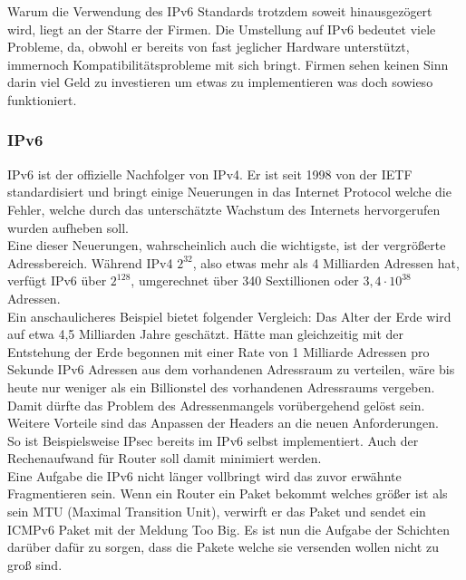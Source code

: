\documentclass[11pt,a4paper]{report}
\begin{document}
Warum die Verwendung des IPv6 Standards trotzdem soweit hinausgezögert wird, liegt an der Starre der Firmen. Die Umstellung auf IPv6 bedeutet viele Probleme, da, obwohl er bereits von fast jeglicher Hardware unterstützt, immernoch Kompatibilitätsprobleme mit sich bringt. Firmen sehen keinen Sinn darin viel Geld zu investieren um etwas zu implementieren was doch sowieso funktioniert.\\
\subsubsection{IPv6}
IPv6 ist der offizielle Nachfolger von IPv4. Er ist seit 1998 von der IETF standardisiert und bringt einige Neuerungen in das Internet Protocol welche die Fehler, welche durch das unterschätzte Wachstum des Internets hervorgerufen wurden aufheben soll.\\

Eine dieser Neuerungen, wahrscheinlich auch die wichtigste, ist der vergrößerte Adressbereich. Während IPv4 $2^{32}$, also etwas mehr als 4 Milliarden Adressen hat, verfügt IPv6 über $2^{128}$, umgerechnet über 340 Sextillionen oder $3,4 \cdot 10^{38}$ Adressen.\\
Ein anschaulicheres Beispiel bietet folgender Vergleich: Das Alter der Erde wird auf etwa 4,5 Milliarden Jahre geschätzt. Hätte man gleichzeitig mit der Entstehung der Erde begonnen mit einer Rate von 1 Milliarde Adressen pro Sekunde IPv6 Adressen aus dem vorhandenen Adressraum zu verteilen, wäre bis heute nur weniger als ein Billionstel des vorhandenen Adressraums vergeben.\\
Damit dürfte das Problem des Adressenmangels vorübergehend gelöst sein.\\

Weitere Vorteile sind das Anpassen der Headers an die neuen Anforderungen.\\
So ist Beispielsweise IPsec bereits im IPv6 selbst implementiert. Auch der Rechenaufwand für Router soll damit minimiert werden.\\

Eine Aufgabe die IPv6 nicht länger vollbringt wird das zuvor erwähnte Fragmentieren sein. Wenn ein Router ein Paket bekommt welches größer ist als sein MTU (Maximal Transition Unit), verwirft er das Paket und sendet ein ICMPv6 Paket mit der Meldung \glqq Too Big\grqq . Es ist nun die Aufgabe der Schichten darüber dafür zu sorgen, dass die Pakete welche sie versenden wollen nicht zu groß sind.\\
\end{document}
